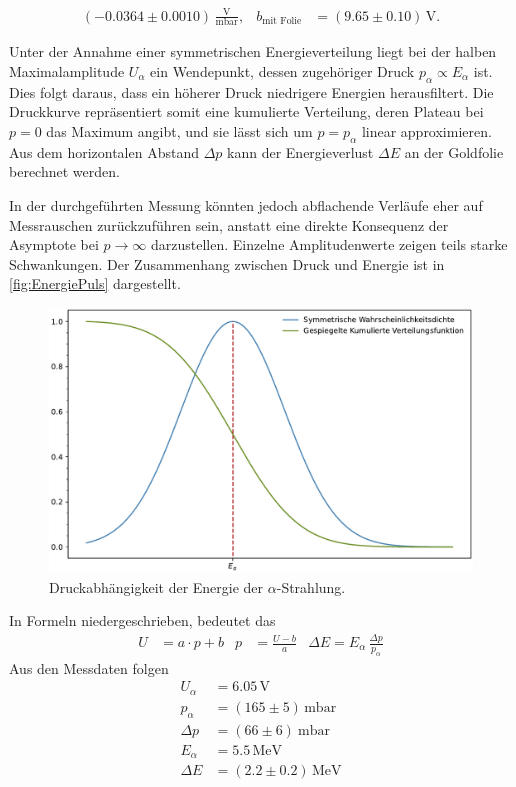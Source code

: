 \begin{align*}
\left(-0.0364 \pm 0.0010\right) \, \frac{\text{V}}{\text{mbar}}, & b_{\text{mit Folie}} &= \left(9.65 \pm 0.10\right) \, \text{V}.
\end{align*}

Unter der Annahme einer symmetrischen Energieverteilung liegt bei der halben Maximalamplitude $U_\alpha$ ein Wendepunkt,  
dessen zugehöriger Druck $p_\alpha \propto E_\alpha$ ist. Dies folgt daraus, dass ein höherer Druck niedrigere Energien herausfiltert.  
Die Druckkurve repräsentiert somit eine kumulierte Verteilung, deren Plateau bei $p = 0$ das Maximum angibt, und sie lässt sich um $p = p_\alpha$ linear approximieren.  
Aus dem horizontalen Abstand $\Delta p$ kann der Energieverlust $\Delta E$ an der Goldfolie berechnet werden.  

In der durchgeführten Messung könnten jedoch abflachende Verläufe eher auf Messrauschen zurückzuführen sein,  
anstatt eine direkte Konsequenz der Asymptote bei $p \to \infty$ darzustellen. Einzelne Amplitudenwerte zeigen teils starke Schwankungen.  
Der Zusammenhang zwischen Druck und Energie ist in \autoref{fig:EnergiePuls} dargestellt.

\begin{figure}[H]
    \centering
    \includegraphics[width=1\textwidth]{content/messung/EnergiePuls.pdf}
    \caption{Druckabhängigkeit der Energie der $\alpha$-Strahlung.}
    \label{fig:EnergiePuls}
\end{figure}

In Formeln niedergeschrieben, bedeutet das 
\begin{align*}
U &= a \cdot p + b & p &= \frac{U - b}{a} & \Delta E = E_\alpha \, \frac{\Delta p}{p_\alpha}
\end{align*}
Aus den Messdaten folgen 
\begin{align*}
U_{\alpha} &= 6.05\, \text{V}\\
p_{\alpha} &= (165\pm 5)\, \text{mbar}\\
\Delta p &= (66\pm 6)\ \text{mbar}\\
E_{\alpha} &= 5.5\, \text{MeV}\\
\Delta E &= (2.2\pm 0.2)\, \text{MeV}\\
\end{align*}

